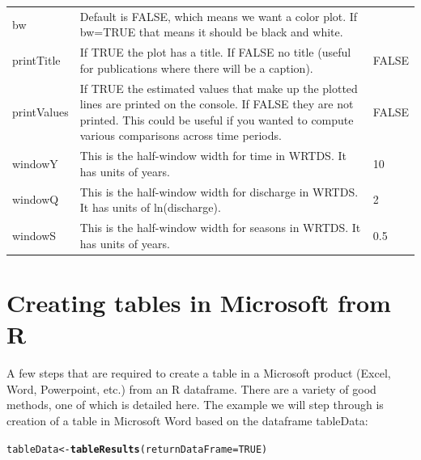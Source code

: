 \documentclass[a4paper,11pt]{article}\usepackage[]{graphicx}\usepackage[]{color}
\makeatletter
\newcommand{\hlnum}[1]{\textcolor[rgb]{0.686,0.059,0.569}{#1}}%
\newcommand{\hlstd}[1]{\textcolor[rgb]{0.345,0.345,0.345}{#1}}%
\newcommand{\hlkwb}[1]{\textcolor[rgb]{0.69,0.353,0.396}{#1}}%
\newcommand{\hlkwc}[1]{\textcolor[rgb]{0.333,0.667,0.333}{#1}}%
\newcommand{\hlkwd}[1]{\textcolor[rgb]{0.737,0.353,0.396}{\textbf{#1}}}%
\newenvironment{kframe}{%
 \def\at@end@of@kframe{}%
 \ifinner\ifhmode%
  \def\at@end@of@kframe{\end{minipage}}%
  \begin{minipage}{\columnwidth}%
 \fi\fi%
 \def\FrameCommand##1{\hskip\@totalleftmargin \hskip-\fboxsep
 \colorbox{shadecolor}{##1}\hskip-\fboxsep
     \hskip-\linewidth \hskip-\@totalleftmargin \hskip\columnwidth}%
 \MakeFramed {\advance\hsize-\width
   \@totalleftmargin\z@ \linewidth\hsize
   \@setminipage}}%
 {\par\unskip\endMakeFramed%
 \at@end@of@kframe}
\newenvironment{knitrout}{}{} %
\makeatother
\begin{document}
\begin{table}[ht]
\begin{tabularx}{\textwidth}{lXl}
bw & Default is FALSE, which means we want a color plot.  If bw=TRUE that means it should be black and white.\\
printTitle & If TRUE the plot has a title.  If FALSE no title (useful for publications where there will be a caption). & FALSE\\
printValues & If TRUE the estimated values that make up the plotted lines are printed on the console.  If FALSE they are not printed.  This could be useful if you wanted to compute various comparisons across time periods. & FALSE\\
windowY & This is the half-window width for time in WRTDS.  It has units of years.  & 10 \\
windowQ & This is the half-window width for discharge in WRTDS.  It has units of ln(discharge).  & 2 \\
windowS & This is the half-window width for seasons in WRTDS.  It has units of years.  & 0.5 \\
\hline
\end{tabularx}

\end{table}

\FloatBarrier


\section{Creating tables in Microsoft from R}
\label{app:createWordTable}
A few steps that are required to create a table in a Microsoft product (Excel, Word, Powerpoint, etc.) from an R dataframe. There are a variety of good methods, one of which is detailed here. The example we will step through is creation of a table in Microsoft Word based on the dataframe tableData:

\begin{knitrout}
\color{fgcolor}\begin{kframe}
\begin{alltt}
\hlstd{tableData} \hlkwb{<-} \hlkwd{tableResults}\hlstd{(}\hlkwc{returnDataFrame}\hlstd{=}\hlnum{TRUE}\hlstd{)}
\end{alltt}
\end{kframe}
\end{knitrout}
\end{document}
